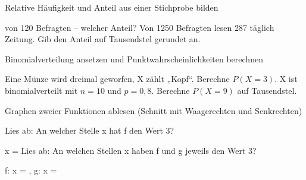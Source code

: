 \setcounter{aufgabe}{0}

\begin{aufgabe}{Relative Häufigkeit und Anteil aus einer Stichprobe bilden}
\begin{teile}
 von 120 Befragten – welcher Anteil? \leerfeld
\teil Von 1250 Befragten lesen 287 täglich Zeitung. Gib den Anteil auf Tausendstel gerundet an. \leerfeld
\end{teile}
\end{aufgabe}

\begin{aufgabe}{Binomialverteilung ansetzen und Punktwahrscheinlichkeiten berechnen}
\begin{teile}
\teil Eine Münze wird dreimal geworfen, X zählt „Kopf“. Berechne $P(X = 3)$. \leerfeld
\teil X ist binomialverteilt mit $n = 10$ und $p = 0{,}8$. Berechne $P(X = 9)$ auf Tausendstel. \leerfeld
\end{teile}
\end{aufgabe}

\begin{aufgabe}{Graphen zweier Funktionen ablesen (Schnitt mit Waagerechten und Senkrechten)}
\begin{teile}
\teil Lies ab: An welcher Stelle x hat f den Wert 3?

\begin{ksys}[xmin=0,xmax=5,ymin=0,ymax=5,ablesen]  \end{ksys}
x = \leerfeld
\teil Lies ab: An welchen Stellen x haben f und g jeweils den Wert 3?

\begin{ksys}[xmin=0,xmax=5,ymin=0,ymax=5,ablesen]   \end{ksys}
f: x = \leerfeld , g: x = \leerfeld
\end{teile}
\end{aufgabe}

